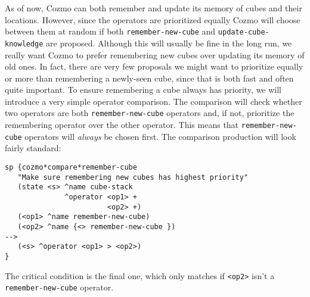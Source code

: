 As of now, Cozmo can both remember and update its memory of cubes and
their locations. However, since the operators are prioritized equally
Cozmo will choose between them at random if both
\texttt{remember-new-cube} and \texttt{update-cube-knowledge} are
proposed. Although this will usually be fine in the long run, we really
want Cozmo to prefer remembering new cubes over updating its memory of
old ones. In fact, there are very few proposals we might want to
prioritize equally or more than remembering a newly-seen cube, since
that is both fast and often quite important. To ensure remembering a
cube always has priority, we will introduce a very simple operator
comparison. The comparison will check whether two operators are both
\texttt{remember-new-cube} operators and, if not, prioritize the
remembering operator over the other operator. This means that
\texttt{remember-new-cube} operators will \emph{always} be chosen first.
The comparison production will look fairly standard:

\begin{verbatim}
sp {cozmo*compare*remember-cube
   "Make sure remembering new cubes has highest priority"
   (state <s> ^name cube-stack
              ^operator <op1> +
                        <op2> +)
   (<op1> ^name remember-new-cube)
   (<op2> ^name {<> remember-new-cube })
-->
   (<s> ^operator <op1> > <op2>)
}
\end{verbatim}

The critical condition is the final one, which only matches if
\texttt{\textless{}op2\textgreater{}} isn't a \texttt{remember-new-cube}
operator.
